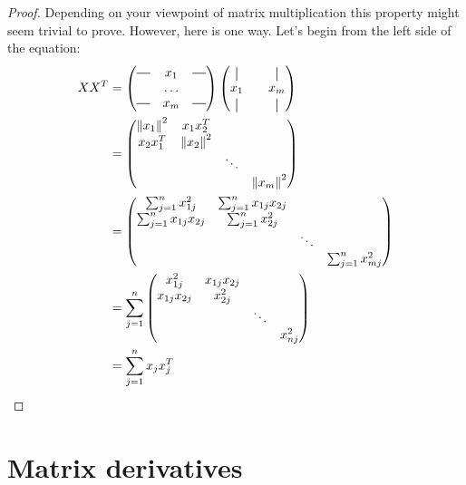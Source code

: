 \begin{proof}
Depending on your viewpoint of matrix multiplication this property
might seem trivial to prove. However, here is one way. Let's begin 
from the left side of the equation:
\begin{equation}
\begin{split}
XX^T &=
\begin{pmatrix}
\horzbar & x_1 & \horzbar \\
& \hdots & \\
\horzbar & x_m & \horzbar \\
\end{pmatrix}
\begin{pmatrix}
\vertbar & & \vertbar \\
x_1 & & x_m \\
\vertbar & & \vertbar \\
\end{pmatrix}\\
&= \begin{pmatrix}
\norm{x_1}^2 & x_{1} x_{2}^T& \\
x_2 x_1^T & \norm{x_2}^2 &  & \\
& & \ddots & \\
& & & \norm{x_m}^2\\
\end{pmatrix}\\
&= \begin{pmatrix}
\sum_{j=1}^{n}x_{1j}^2 & \sum_{j=1}^{n} x_{1j}x_{2j} & \\
\sum_{j=1}^{n} x_{1j}x_{2j} & \sum_{j=1}^{n}x_{2j}^2  &  & \\
& & \ddots & \\
& & & \sum_{j=1}^{n}x_{mj}^2 \\
\end{pmatrix}\\
&= \sum_{j=1}^{n}
\begin{pmatrix}
x_{1j}^2 & x_{1j}x_{2j} & \\
x_{1j}x_{2j} & x_{2j}^2  &  & \\
& & \ddots & \\
& & & x_{nj}^2 \\
\end{pmatrix}\\
&= \sum_{j=1}^{n} x_jx_j^T
\end{split}
\end{equation}
\end{proof}
\section*{Matrix derivatives}

